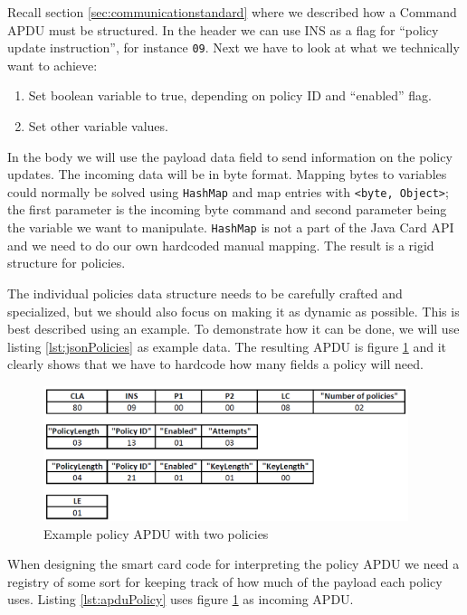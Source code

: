 Recall section \ref{sec:communicationstandard} where we described how a Command APDU must be structured. In the header we can use INS as a flag for ``policy update instruction'', for instance \texttt{09}. Next we have to look at what we technically want to achieve:
\begin{enumerate}
    \item Set boolean variable to true, depending on policy ID and ``enabled'' flag.
    \item Set other variable values.
\end{enumerate}
In the body we will use the payload data field to send information on the policy updates. The incoming data will be in byte format. Mapping bytes to variables could normally be solved using \texttt{HashMap} and map entries with \texttt{<byte, Object>}; the first parameter is the incoming byte command and second parameter being the variable we want to manipulate. \texttt{HashMap} is not a part of the Java Card API and we need to do our own hardcoded manual mapping. The result is a rigid structure for policies.

The individual policies data structure needs to be carefully crafted and specialized, but we should also focus on making it as dynamic as possible. This is best described using an example. To demonstrate how it can be done, we will use listing \ref{lst:jsonPolicies} as example data. The resulting APDU is figure \ref{fig:policyAPDU} and it clearly shows that we have to hardcode how many fields a policy will need.

\begin{figure}[h!]
  \captionsetup{justification=centering,margin=1.5cm}
  \caption{Example policy APDU with two policies}
  \label{fig:policyAPDU}
  \centering
    \includegraphics[width=0.95\textwidth]{images/policyAPDU.png}
\end{figure}

When designing the smart card code for interpreting the policy APDU we need a registry of some sort for keeping track of how much of the payload each policy uses. Listing \ref{lst:apduPolicy} uses figure \ref{fig:policyAPDU} as incoming APDU.

